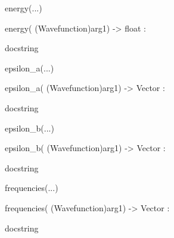 \documentclass[letterpaper,10pt,english]{sphinxmanual}
\begin{document}
\begin{description}
\begin{description}
\begin{DUlineblock}{0em}
\begin{DUlineblock}{\DUlineblockindent}
\begin{DUlineblock}{\DUlineblockindent}
\end{DUlineblock}
\end{DUlineblock}
\item[] energy(...)
\item[]
\begin{DUlineblock}{\DUlineblockindent}
\item[] energy( (Wavefunction)arg1) -\textgreater{} float :
\item[]
\begin{DUlineblock}{\DUlineblockindent}
\item[] docstring
\item[] 
\end{DUlineblock}
\end{DUlineblock}
\item[] epsilon\_a(...)
\item[]
\begin{DUlineblock}{\DUlineblockindent}
\item[] epsilon\_a( (Wavefunction)arg1) -\textgreater{} Vector :
\item[]
\begin{DUlineblock}{\DUlineblockindent}
\item[] docstring
\item[] 
\end{DUlineblock}
\end{DUlineblock}
\item[] epsilon\_b(...)
\item[]
\begin{DUlineblock}{\DUlineblockindent}
\item[] epsilon\_b( (Wavefunction)arg1) -\textgreater{} Vector :
\item[]
\begin{DUlineblock}{\DUlineblockindent}
\item[] docstring
\item[] 
\end{DUlineblock}
\end{DUlineblock}
\item[] frequencies(...)
\item[]
\begin{DUlineblock}{\DUlineblockindent}
\item[] frequencies( (Wavefunction)arg1) -\textgreater{} Vector :
\item[]
\begin{DUlineblock}{\DUlineblockindent}
\item[] docstring
\item[] 
\end{DUlineblock}

\end{DUlineblock}
\end{DUlineblock}
\end{description}
\end{description}
\end{document}
